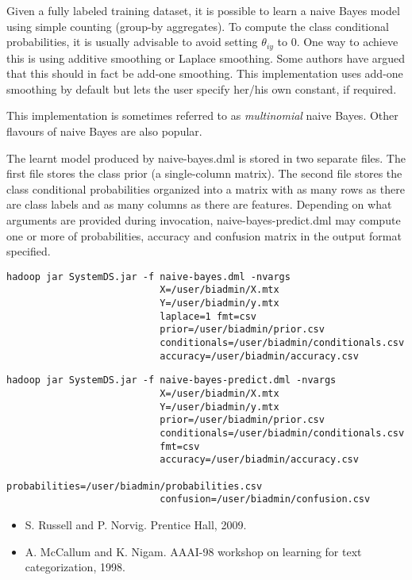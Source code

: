 Given a fully labeled training dataset, it is possible to learn a naive Bayes 
model using simple counting (group-by aggregates). To compute the class conditional
probabilities, it is usually advisable to avoid setting $\theta_{iy}$ to 0. One way to 
achieve this is using additive smoothing or Laplace smoothing. Some authors have argued
that this should in fact be add-one smoothing. This implementation uses add-one smoothing
by default but lets the user specify her/his own constant, if required.

This implementation is sometimes referred to as \emph{multinomial} naive Bayes. Other
flavours of naive Bayes are also popular.
\\


The learnt model produced by naive-bayes.dml is stored in two separate files. 
The first file stores the class prior (a single-column matrix). The second file 
stores the class conditional probabilities organized into a matrix with as many 
rows as there are class labels and as many columns as there are features. 
Depending on what arguments are provided during invocation, naive-bayes-predict.dml 
may compute one or more of probabilities, accuracy and confusion matrix in the 
output format specified. 
\\


\begin{verbatim}
hadoop jar SystemDS.jar -f naive-bayes.dml -nvargs 
                           X=/user/biadmin/X.mtx 
                           Y=/user/biadmin/y.mtx 
                           laplace=1 fmt=csv
                           prior=/user/biadmin/prior.csv
                           conditionals=/user/biadmin/conditionals.csv
                           accuracy=/user/biadmin/accuracy.csv
\end{verbatim}

\begin{verbatim}
hadoop jar SystemDS.jar -f naive-bayes-predict.dml -nvargs 
                           X=/user/biadmin/X.mtx 
                           Y=/user/biadmin/y.mtx 
                           prior=/user/biadmin/prior.csv
                           conditionals=/user/biadmin/conditionals.csv
                           fmt=csv
                           accuracy=/user/biadmin/accuracy.csv
                           probabilities=/user/biadmin/probabilities.csv
                           confusion=/user/biadmin/confusion.csv
\end{verbatim}


\begin{itemize}
\item S. Russell and P. Norvig.  Prentice Hall, 2009.
\item A. McCallum and K. Nigam.  
\newblock AAAI-98 workshop on learning for text categorization, 1998.
\end{itemize}
